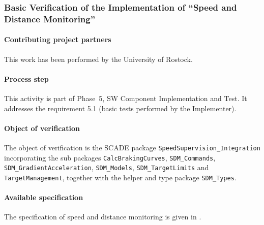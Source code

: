 

\subsubsection{Basic Verification of the Implementation of ``Speed and
  Distance Monitoring'' }
\label{sec:}

\paragraph{Contributing project partners}
This work has been performed by the University of Rostock.

\paragraph{Process step}

This activity is part of Phase~5, SW Component Implementation and Test. It
addresses the requirement 5.1 (basic tests performed by the
Implementer). 


\paragraph{Object of verification}

The object of verification is the SCADE package
\texttt{SpeedSupervision\_Integration} incorporating the sub packages
\texttt{CalcBrakingCurves}, \texttt{SDM\_Commands},
\texttt{SDM\_GradientAcceleration}, \texttt{SDM\_Models},
\texttt{SDM\_TargetLimits} and \texttt{TargetManagement}, together
with the helper and type package \texttt{SDM\_Types}.

\paragraph{Available specification}

The specification of speed and distance monitoring is given in
\cite[Sec.~3.13]{subset-026:3.3.0}. 

